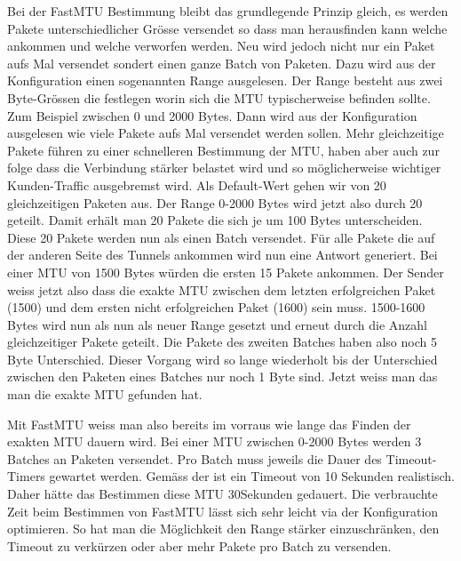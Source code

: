 Bei der FastMTU Bestimmung bleibt das grundlegende Prinzip gleich, es werden Pakete unterschiedlicher Grösse versendet so dass man herausfinden kann welche ankommen und welche verworfen werden. Neu wird jedoch nicht nur ein Paket aufs Mal versendet sondert einen ganze Batch von Paketen. Dazu wird aus der Konfiguration einen sogenannten Range ausgelesen. Der Range besteht aus zwei Byte-Grössen die festlegen worin sich die \acs{MTU} typischerweise befinden sollte. Zum Beispiel zwischen 0 und 2000 Bytes. Dann wird aus der Konfiguration ausgelesen wie viele Pakete aufs Mal versendet werden sollen. Mehr gleichzeitige Pakete führen zu einer schnelleren Bestimmung der \acs{MTU}, haben aber auch zur folge dass die Verbindung stärker belastet wird und so möglicherweise wichtiger Kunden-Traffic ausgebremst wird. Als Default-Wert gehen wir von 20 gleichzeitigen Paketen aus. Der Range 0-2000 Bytes wird jetzt also durch 20 geteilt. Damit erhält man 20 Pakete die sich je um 100 Bytes unterscheiden. Diese 20 Pakete werden nun als einen Batch versendet.
Für alle Pakete die auf der anderen Seite des Tunnels ankommen wird nun eine Antwort generiert. Bei einer MTU von 1500 Bytes würden die ersten 15 Pakete ankommen. Der Sender weiss jetzt also dass die exakte \acs{MTU} zwischen dem letzten erfolgreichen Paket (1500) und dem ersten nicht erfolgreichen Paket (1600) sein muss. 1500-1600 Bytes wird nun als nun als neuer Range gesetzt und erneut durch die Anzahl gleichzeitiger Pakete geteilt. Die Pakete des zweiten Batches haben also noch 5 Byte Unterschied. Dieser Vorgang wird so lange wiederholt bis der Unterschied zwischen den Paketen eines Batches nur noch 1 Byte sind. Jetzt weiss man das man die exakte \acs{MTU} gefunden hat.

Mit FastMTU weiss man also bereits im vorraus wie lange das Finden der exakten \acs{MTU} dauern wird. Bei einer MTU zwischen 0-2000 Bytes werden 3 Batches an Paketen versendet. Pro Batch muss jeweils die Dauer des Timeout-Timers gewartet werden. Gemäss der \osag ist ein Timeout von 10 Sekunden realistisch. Daher hätte das Bestimmen diese \acs{MTU} 30Sekunden gedauert.
Die verbrauchte Zeit beim Bestimmen von FastMTU lässt sich sehr leicht via der Konfiguration optimieren. So hat man die Möglichkeit den Range stärker einzuschränken, den Timeout zu verkürzen oder aber mehr Pakete pro Batch zu versenden.

